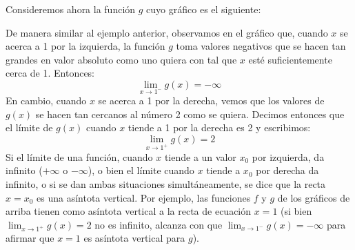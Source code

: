 \documentclass[../Teoría.root.tex]{subfiles}
\begin{document}
Consideremos ahora la función \(g\) cuyo gráfico es el siguiente:
\begin{center}
\end{center}
De manera similar al ejemplo anterior, observamos en el gráfico que, cuando \(x\) se acerca a 1 por la izquierda, la función \(g\) toma valores negativos que se hacen tan grandes en valor absoluto como uno quiera con tal que \(x\) esté suficientemente cerca de 1.
Entonces:
\[\lim_{x\to1^-}g(x)=-\infty\]
En cambio, cuando \(x\) se acerca a 1 por la derecha, vemos que los valores de \(g(x)\) se hacen tan cercanos al número 2 como se quiera.
Decimos entonces que el límite de \(g(x)\) cuando \(x\) tiende a 1 por la derecha es 2 y escribimos:
\[\lim_{x\to1^+}g(x)=2\]
Si el límite de una función, cuando \(x\) tiende a un valor \(x_0\) por izquierda, da infinito (\(+\infty\) o \(-\infty\)), o bien el límite cuando \(x\) tiende a \(x_0\) por derecha da infinito, o si se dan ambas situaciones simultáneamente, se dice que la recta \(x=x_0\) es una asíntota vertical.
Por ejemplo, las funciones \(f\) y \(g\) de los gráficos de arriba tienen como asíntota vertical a la recta de ecuación \(x=1\) (si bien \(\lim_{x\to1^+}g(x)=2\) no es infinito, alcanza con que \(\lim_{x\to1^−}g(x)=-\infty\) para afirmar que \(x=1\) es asíntota vertical para \(g\)).
\end{document}
